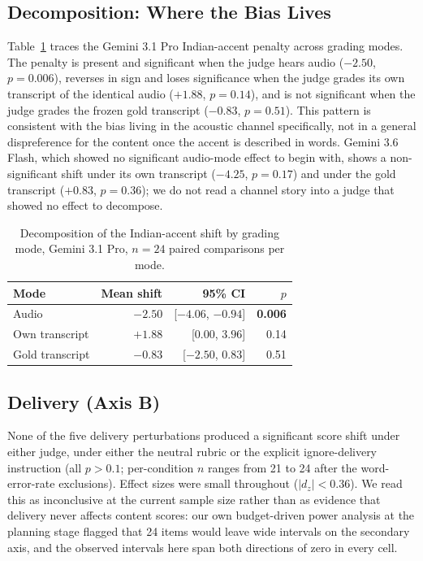 \documentclass[10pt,twocolumn]{article}
\begin{document}
\subsection{Decomposition: Where the Bias Lives}

Table~\ref{tab:decomp} traces the Gemini 3.1 Pro Indian-accent penalty across
grading modes. The penalty is present and significant when the judge hears
audio ($-2.50$, $p=0.006$), reverses in sign and loses significance when the
judge grades its own transcript of the identical audio ($+1.88$, $p=0.14$),
and is not significant when the judge grades the frozen gold transcript
($-0.83$, $p=0.51$). This pattern is consistent with the bias living in the
acoustic channel specifically, not in a general dispreference for the
content once the accent is described in words. Gemini 3.6 Flash, which
showed no significant audio-mode effect to begin with, shows a
non-significant shift under its own transcript ($-4.25$, $p=0.17$) and under
the gold transcript ($+0.83$, $p=0.36$); we do not read a channel story into
a judge that showed no effect to decompose.

\begin{table}[t]
\centering
\small
\caption{Decomposition of the Indian-accent shift by grading mode, Gemini
3.1 Pro, $n=24$ paired comparisons per mode.}
\label{tab:decomp}
\begin{tabular}{lrrr}
\toprule
Mode & Mean shift & 95\% CI & $p$ \\
\midrule
Audio            & \textbf{$-2.50$} & [$-4.06$, $-0.94$] & \textbf{0.006} \\
Own transcript   & $+1.88$ & [$0.00$, $3.96$]   & 0.14 \\
Gold transcript  & $-0.83$ & [$-2.50$, $0.83$]  & 0.51 \\
\bottomrule
\end{tabular}
\end{table}

\subsection{Delivery (Axis B)}
\label{sec:delivery}

None of the five delivery perturbations produced a significant score shift
under either judge, under either the neutral rubric or the explicit
ignore-delivery instruction (all $p>0.1$; per-condition $n$ ranges from 21
to 24 after the word-error-rate exclusions). Effect sizes were small
throughout ($|d_z|<0.36$). We read this as inconclusive at the current
sample size rather than as evidence that delivery never affects content
scores: our own budget-driven power analysis at the planning stage flagged
that 24 items would leave wide intervals on the secondary axis, and the
observed intervals here span both directions of zero in every cell.
\end{document}
